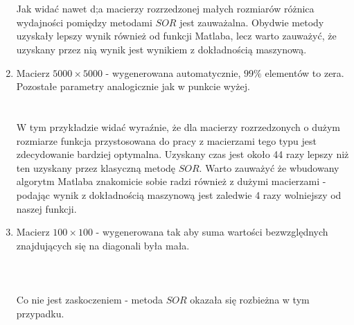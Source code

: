 \documentclass{article}
\begin{document}
\begin{enumerate}
\noindent{}\\\\
Jak widać nawet d;a macierzy rozrzedzonej małych rozmiarów różnica wydajności pomiędzy metodami $SOR$ jest zauważalna. Obydwie metody uzyskały lepszy wynik również od funkcji Matlaba, lecz warto zauważyć, że uzyskany przez nią wynik jest wynikiem z dokładnością maszynową.
\item Macierz $5000 \times 5000$ - wygenerowana automatycznie, $99\%$ elementów to zera. Pozostałe parametry analogicznie jak w punkcie wyżej.\\
\noindent{}\\\\
W tym przykładzie widać wyraźnie, że dla macierzy rozrzedzonych o dużym rozmiarze funkcja przystosowana do pracy z macierzami tego typu jest zdecydowanie bardziej optymalna. Uzyskany czas jest około 44 razy lepszy niż ten uzyskany przez klasyczną metodę $SOR$. Warto zauważyć że wbudowany algorytm Matlaba znakomicie sobie radzi również z dużymi macierzami - podając wynik z dokładnością maszynową jest zaledwie 4 razy wolniejszy od naszej funkcji.
\item Macierz $100\times 100$ - wygenerowana tak aby suma wartości bezwzględnych znajdujących się na diagonali była mała.\\\\
\noindent{}\\\\
Co nie jest zaskoczeniem - metoda $SOR$ okazała się rozbieżna w tym przypadku.
\end{enumerate}
\end{document}
